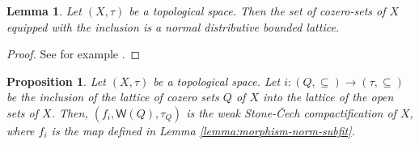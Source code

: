 \documentclass{article}
\theoremstyle{plain}
\newtheorem{proposition}[theorem]{Proposition}
\newtheorem{lemma}[theorem]{Lemma}
\theoremstyle{definition}
\theoremstyle{remark}
\newcommand{\bp}[1]{\left\lbrace #1 \right\rbrace}
\newcommand{\0}{\mathbbm 0}
\newcommand{\1}{\mathbbm 1}
\newcommand{\2}{\mathbbm 2}
\begin{document}
\begin{lemma}
\label{lemma:cozerosetsarenormal}
    Let $(X,\tau)$ be a topological space. Then the set of cozero-sets of $X$ equipped with the inclusion is a normal distributive bounded lattice. 
\end{lemma}
\begin{proof} See for example \cite[Proposition D.3.4]{VIABOOKFORCING}.
%
%
\end{proof}

\begin{proposition}
\label{prop:stonecechaasfiltersofcozerosets}
Let $(X,\tau)$ be a topological space. Let $i: (Q, \subseteq) \to (\tau, \subseteq)$ be the inclusion of the lattice of cozero sets $Q$ of $X$ into the lattice of the open sets of $X$.   Then, $(f_i, \mathsf{W}(Q), \tau_Q)$ is the weak Stone-\v{C}ech compactification of $X$, where $f_i$ is the map defined in Lemma \ref{lemma:morphism-norm-subfit}.
\end{proposition}
\end{document}
